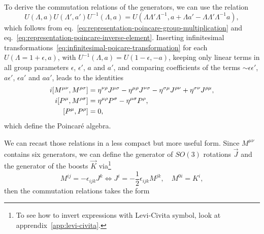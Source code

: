 To derive the commutation relations of the generators, we can use the relation
\begin{equation}
    U(\Lambda, a) U(\Lambda',a') U^{-1}(\Lambda,a) = U(\Lambda \Lambda' \Lambda^{-1}, a + \Lambda a' - \Lambda \Lambda' \Lambda^{-1}a) ,
\end{equation}
which follows from eq.~\eqref{eq:representation-poincare-group-multiplication} and eq.~\eqref{eq:representation-poincare-inverse-element}. Inserting infinitesimal transformations~\eqref{eq:infinitesimal-poicare-transformation} for each $U(\Lambda = 1 + \epsilon, a)$, with $U^{-1} (\Lambda,a) = U(1-\epsilon,-a)$, keeping only linear terms in all group parameters $\epsilon$, $\epsilon'$, $a$ and $a'$, and comparing coefficients of the terms $\sim \epsilon\epsilon'$, $a\epsilon'$, $\epsilon a'$ and $aa'$, leads to the identities
\begin{subequations}
\begin{align}
    i \comm{M^{\mu\nu}}{M^{\rho\sigma}} &= \eta^{\nu\rho} J^{\mu\sigma} - \eta^{\mu\rho} J^{\nu\sigma} - \eta^{\sigma\mu} J^{\rho\nu} + \eta^{\sigma\nu} J^{\rho\mu} , \\
    i \comm{P^\mu}{M^{\rho\sigma}} &= \eta^{\mu\rho} P^\sigma - \eta^{\mu\sigma} P^\rho , \\
    \comm{P^\mu}{P^\rho} &= 0 ,
\end{align}
\end{subequations}
which define the Poincaré algebra.

We can recast those relations in a less compact but more useful form. Since $M^{\mu\nu}$ contains six generators, we can define the generator of $SO(3)$ rotations $\vec{J}$ and the generator of the boosts $\vec{K}$ via\footnote{To see how to invert expressions with Levi-Civita symbol, look at apprendix~\ref{app:levi-civita}.}
\begin{equation}\label{eq:poincare-boosts-rotations}
    M^{ij} = - \epsilon_{ijk} J^k \iff J^i =- \frac{1}{2} \epsilon_{ijk} M^{jk}, \quad M^{0i} = K^i, 
\end{equation}
then the commutation relations takes the form

